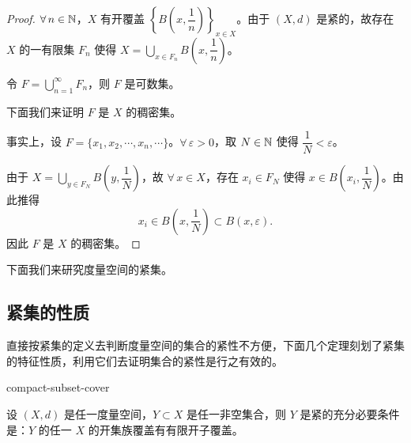 \begin{proof}

$\forall\,n\in\mathbb{N}$，$X$ 有开覆盖 $\left\{B\left(x,\dfrac1n\right)\right\}_{x\in X}$。由于 $(X,d)$ 是紧的，故存在 $X$ 的一有限集 $F_n$ 使得 $X=\displaystyle\bigcup_{x\in F_n}B\left(x,\dfrac1n\right)$。

令 $F=\displaystyle\bigcup_{n=1}^{\infty}F_n$，则 $F$ 是可数集。

下面我们来证明 $F$ 是 $X$ 的稠密集。

事实上，设 $F=\{x_1,x_2,\cdots,x_n,\cdots\}$。$\forall\,\varepsilon>0$，取 $N\in\mathbb{N}$ 使得 $\dfrac1N<\varepsilon$。

由于 $X=\displaystyle\bigcup_{y\in F_N}B\left(y,\dfrac1N\right)$，故 $\forall\,x\in X$，存在 $x_i\in F_N$ 使得 $x\in B\left(x_i,\dfrac1N\right)$。由此推得
\[x_i\in B\left(x,\dfrac1N\right)\subset B(x,\varepsilon).\]
因此 $F$ 是 $X$ 的稠密集。

\end{proof}

下面我们来研究度量空间的紧集。

\subsection{紧集的性质}

直接按紧集的定义去判断度量空间的集合的紧性不方便，下面几个定理刻划了紧集的特征性质，利用它们去证明集合的紧性是行之有效的。

\begin{mythm}{}{compact-subset-cover}

设 $(X,d)$ 是任一度量空间，$Y\subset X$ 是任一非空集合，则 $Y$ 是紧的充分必要条件是：$Y$ 的任一 $X$ 的开集族覆盖有有限开子覆盖。

\end{mythm}

